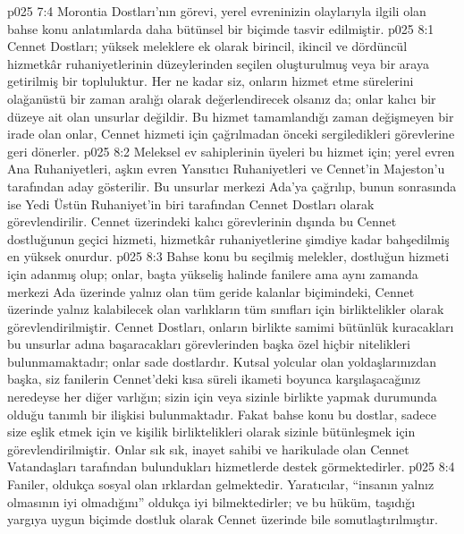 \vs p025 7:4 Morontia Dostları’nın görevi, yerel evreninizin olaylarıyla ilgili olan bahse konu anlatımlarda daha bütünsel bir biçimde tasvir edilmiştir.
\vs p025 8:1 Cennet Dostları; yüksek meleklere ek olarak birincil, ikincil ve dördüncül hizmetkâr ruhaniyetlerinin düzeylerinden seçilen oluşturulmuş veya bir araya getirilmiş bir topluluktur. Her ne kadar siz, onların hizmet etme sürelerini olağanüstü bir zaman aralığı olarak değerlendirecek olsanız da; onlar kalıcı bir düzeye ait olan unsurlar değildir. Bu hizmet tamamlandığı zaman değişmeyen bir irade olan onlar, Cennet hizmeti için çağrılmadan önceki sergiledikleri görevlerine geri dönerler.
\vs p025 8:2 Meleksel ev sahiplerinin üyeleri bu hizmet için; yerel evren Ana Ruhaniyetleri, aşkın evren Yansıtıcı Ruhaniyetleri ve Cennet’in Majeston’u tarafından aday gösterilir. Bu unsurlar merkezi Ada’ya çağrılıp, bunun sonrasında ise Yedi Üstün Ruhaniyet’in biri tarafından Cennet Dostları olarak görevlendirilir. Cennet üzerindeki kalıcı görevlerinin dışında bu Cennet dostluğunun geçici hizmeti, hizmetkâr ruhaniyetlerine şimdiye kadar bahşedilmiş en yüksek onurdur.
\vs p025 8:3 Bahse konu bu seçilmiş melekler, dostluğun hizmeti için adanmış olup; onlar, başta yükseliş halinde fanilere ama aynı zamanda merkezi Ada üzerinde yalnız olan tüm geride kalanlar biçimindeki, Cennet üzerinde yalnız kalabilecek olan varlıkların tüm sınıfları için birliktelikler olarak görevlendirilmiştir. Cennet Dostları, onların birlikte samimi bütünlük kuracakları bu unsurlar adına başaracakları görevlerinden başka özel hiçbir nitelikleri bulunmamaktadır; onlar sade dostlardır. Kutsal yolcular olan yoldaşlarınızdan başka, siz fanilerin Cennet’deki kısa süreli ikameti boyunca karşılaşacağınız neredeyse her diğer varlığın; sizin için veya sizinle birlikte yapmak durumunda olduğu tanımlı bir ilişkisi bulunmaktadır. Fakat bahse konu bu dostlar, sadece size eşlik etmek için ve kişilik birliktelikleri olarak sizinle bütünleşmek için görevlendirilmiştir. Onlar sık sık, inayet sahibi ve harikulade olan Cennet Vatandaşları tarafından bulundukları hizmetlerde destek görmektedirler.
\vs p025 8:4 Faniler, oldukça sosyal olan ırklardan gelmektedir. Yaratıcılar, “insanın yalnız olmasının iyi olmadığını” oldukça iyi bilmektedirler; ve bu hüküm, taşıdığı yargıya uygun biçimde dostluk olarak Cennet üzerinde bile somutlaştırılmıştır.

